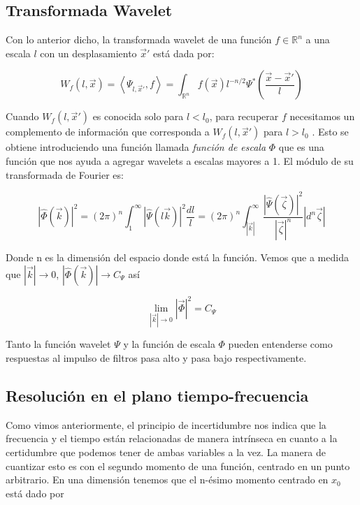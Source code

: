 \documentclass[conference]{IEEEtran}
\begin{document}
\subsection{Transformada Wavelet}
Con lo anterior dicho, la transformada wavelet de una función $f \in \mathds{R}^n$ a una escala $l$ con un desplasamiento $\vec{x}'$ está dada por:

\begin{equation}
  W_f(l,\vec{x}) = \left<\Psi_{l,\vec{x}'}, f \right> = \int_{\mathds{R}^n} f(\vec{x})l^{-n/2} \Psi^* \left(\frac{\vec{x}-\vec{x}'}{l}\right)
\end{equation}


Cuando $W_f(l,\vec{x}')$ es conocida solo para $l<l_0$, para recuperar $f$ necesitamos un complemento de información que corresponda a $W_f(l,\vec{x}')$ para $l>l_0$   \cite{wavelettour}. Esto se obtiene introduciendo una función llamada \emph{función de escala} $\Phi$ que es una función que nos ayuda a agregar wavelets a escalas mayores a 1. El módulo de su transformada de Fourier es:


\begin{equation}
  |\hat{\Phi}(\vec{k})|^2 = (2\pi)^n\int_1^\infty |\hat{\Psi}(l\vec{k})|^2\frac{dl}{l} = (2\pi)^n\int_{|\vec{k}|}^\infty \frac{|\hat{\Psi}(\vec{\zeta})|^2}{|\vec{\zeta}|^n} |d^n \vec{\zeta}|
\end{equation}

Donde n es la dimensión del espacio donde está la función. Vemos que a medida que $|\vec{k}| \to 0$, $|\hat{\Phi}(\vec{k})| \to C_\Psi$ así

\begin{equation}
  \lim_{|\vec{k}| \to 0} |\vec{\Phi}|^2 = C_\Psi
\end{equation}

Tanto la función wavelet $\Psi$ y la función de escala $\Phi$ pueden entenderse como respuestas al impulso de filtros pasa alto y pasa bajo respectivamente.    \cite{wavelettour}


\subsection{Resolución en el plano tiempo-frecuencia}

Como vimos anteriormente, el principio de incertidumbre  nos indica que la frecuencia y el tiempo están relacionadas de manera intrínseca en cuanto a la certidumbre que podemos tener de ambas variables a la vez. La manera de cuantizar esto es con el segundo momento de una función, centrado en un punto arbitrario. En una dimensión tenemos que el n-ésimo momento centrado en $x_0$ está dado por
\end{document}

